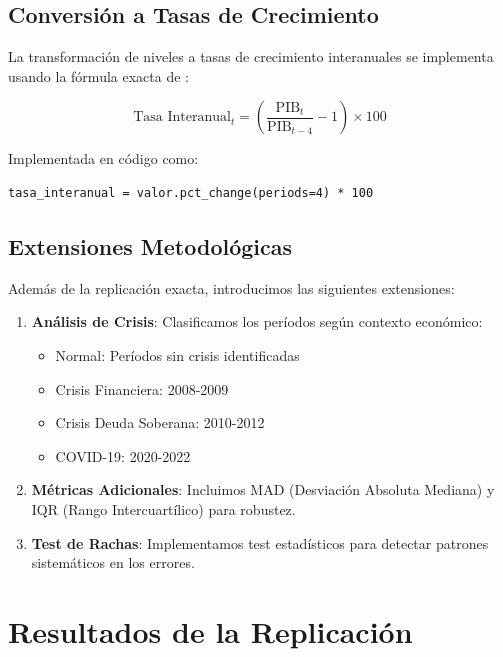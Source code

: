 \documentclass[12pt,a4paper]{article}
\begin{document}
\subsection{Conversión a Tasas de Crecimiento}

La transformación de niveles a tasas de crecimiento interanuales se implementa usando la fórmula exacta de \citet{pavia2017}:

\begin{equation}
\text{Tasa Interanual}_t = \left(\frac{\text{PIB}_t}{\text{PIB}_{t-4}} - 1\right) \times 100
\end{equation}

Implementada en código como:
\begin{verbatim}
tasa_interanual = valor.pct_change(periods=4) * 100
\end{verbatim}

\subsection{Extensiones Metodológicas}

Además de la replicación exacta, introducimos las siguientes extensiones:

\begin{enumerate}
\item \textbf{Análisis de Crisis}: Clasificamos los períodos según contexto económico:
   \begin{itemize}
   \item Normal: Períodos sin crisis identificadas
   \item Crisis Financiera: 2008-2009
   \item Crisis Deuda Soberana: 2010-2012  
   \item COVID-19: 2020-2022
   \end{itemize}

\item \textbf{Métricas Adicionales}: Incluimos MAD (Desviación Absoluta Mediana) y IQR (Rango Intercuartílico) para robustez.

\item \textbf{Test de Rachas}: Implementamos test estadísticos para detectar patrones sistemáticos en los errores.
\end{enumerate}

\section{Resultados de la Replicación}
\end{document}
